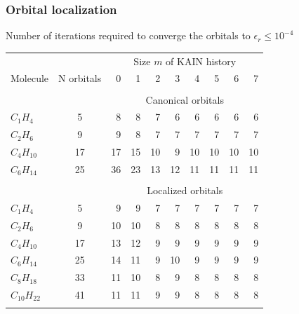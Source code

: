 \documentclass[mathserif, 10pt]{beamer}
\begin{document}
\begin{frame}
\frametitle{Orbital localization}
    \centering
    Number of iterations required to converge the orbitals to $\epsilon_r \leq 10^{-4}$
\begin{table}
\tiny
\centering
\begin{tabular}{lcrrrrrrrr}
\hline
\hline
	    &		&\multicolumn{8}{c}{Size $m$ of KAIN history}\\
Molecule    & N orbitals&  0	&  1    &  2    &  3    &  4    &  5    &  6    &  7    \\
\hline
              	&   	&       &       &       &       &       &       &       &       \\
&&\multicolumn{8}{c}{Canonical orbitals}\\
$C_{ 1}H_{ 4}$	&  5    &  8    &  8    &  7    &  6    &  6    &  6    &  6    &  6    \\ 
$C_{ 2}H_{ 6}$	&  9    &  9    &  8    &  7    &  7    &  7    &  7    &  7    &  7    \\ 
$C_{ 4}H_{10}$	& 17    & 17    & 15    & 10    &  9    & 10    & 10    & 10    & 10    \\
$C_{ 6}H_{14}$	& 25	& 36    & 23    & 13    & 12    & 11    & 11    & 11    & 11    \\
              	&   	&       &       &       &       &       &       &       &       \\
&&\multicolumn{8}{c}{Localized orbitals}\\
$C_{ 1}H_{ 4}$	&  5	&  9    &  9    &  7    &  7    &  7    &  7    &  7    &  7    \\ 
$C_{ 2}H_{ 6}$	&  9	& 10    & 10    &  8    &  8    &  8    &  8    &  8    &  8    \\ 
$C_{ 4}H_{10}$	& 17	& 13    & 12    &  9    &  9    &  9    &  9    &  9    &  9    \\
$C_{ 6}H_{14}$	& 25	& 14    & 11    &  9    & 10    &  9    &  9    &  9    &  9    \\
$C_{ 8}H_{18}$	& 33	& 11    & 10    &  8    &  9    &  8    &  8    &  8    &  8    \\
$C_{10}H_{22}$	& 41	& 11    & 11    &  9    &  9    &  8    &  8    &  8    &  8    \\
              	&   	&       &       &       &       &       &       &       &       \\
\hline
\hline
\end{tabular}
\end{table}
\end{frame}
\end{document}
